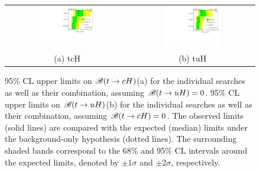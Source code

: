 \documentclass[PAPER, coverpage, atlasdraft=true, texlive=2016, UKenglish]{\ATLASLATEXPATH atlasdoc}
\begin{document}
\begin{figure}[h!]
\begin{center}
\begin{tabular}{@{}cc@{}}
\includegraphics[width=0.49\textwidth]{figures/tcH_Limits.pdf}&
\includegraphics[width=0.49\textwidth]{figures/tuH_Limits.pdf}\\
(a) tcH & (b) tuH \\
\end{tabular}
\caption{\small {95\% CL upper limits on $\mathscr{B}(t\to cH)$(a) for the individual searches as well as their
combination, assuming $\mathscr{B}(t\to uH)=0$. 95\% CL upper limits on $\mathscr{B}(t\to uH)$(b) for the individual searches as well as their
combination, assuming $\mathscr{B}(t\to cH)=0$. The observed limits (solid lines) are compared with the 
expected (median) limits under the background-only hypothesis (dotted lines). The surrounding shaded bands correspond to the 68\% and 95\% CL intervals around the expected limits, 
denoted by $\pm 1\sigma$ and $\pm 2\sigma$, respectively.
}}
\label{fig:limits_combo_1D_hc} 
\end{center}
\end{figure}

\end{document}
